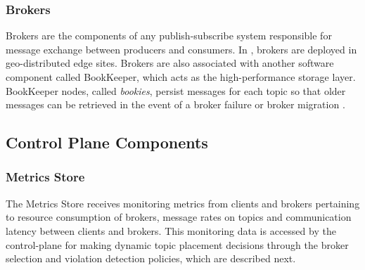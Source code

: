 \subsubsection{Brokers}
Brokers are the components of any publish-subscribe system responsible for message exchange between producers and consumers. In \epulsar, brokers are deployed in geo-distributed edge sites. Brokers are also associated with another software component called BookKeeper, which acts as the high-performance storage layer. BookKeeper nodes, called \textit{bookies}, persist messages for each topic so that older messages can be retrieved in the event of a broker failure or broker migration . 
\subsection{Control Plane Components}
\subsubsection{Metrics Store}
The Metrics Store receives monitoring metrics from clients and brokers pertaining to resource consumption of brokers, message rates on topics and communication latency between clients and brokers. This monitoring data is accessed by the control-plane for making dynamic topic placement decisions through the broker selection and violation detection policies, which are described next.
